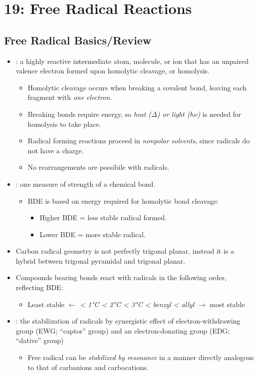\chapter{19: Free Radical Reactions}\label{19: Free Radical Reactions}
\section{Free Radical Basics/Review}\label{Free Radical Basics/Review}
\begin{itemize}
    \item {}: a highly reactive intermediate atom, molecule, or ion that has an unpaired valence electron formed upon homolytic cleavage, or homolysis. 
      \begin{itemize}
        \item Homolytic cleavage occurs when breaking a covalent bond, leaving each fragment with \emph{one electron}.
        \item Breaking bonds require energy, so \emph{heat (\(\Delta \)) or light (\(h\nu \))} is needed for homolysis to take place.
        \item Radical forming reactions proceed in \emph{nonpolar solvents}, since radicals do not have a charge.
        \item No rearrangements are possibile with radicals.
      \end{itemize}
    \item {}: one measure of strength of a chemical bond. 
      \begin{itemize}
        \item BDE is based on energy required for homolytic bond cleavage:
          \begin{itemize}
            \item Higher BDE = less stable radical formed.
            \item Lower BDE = more stable radical.
          \end{itemize}
      \end{itemize}
    \item Carbon radical geometry is not perfectly trigonal planar, instead it is a hybrid between trigonal pyramidal and trigonal planar.
    \item Compounds bearing  bonds react with radicals in the following order, reflecting  BDE\@:
      \begin{itemize}
        \item Least stable \(\leftarrow \) \emph{ < \ang{1}C < \ang{2}C < \ang{3}C < benzyl < allyl} \(\rightarrow \) most stable
      \end{itemize}
    \item {}: the stabilization of radicals by synergistic effect of electron-withdrawing group (EWG\@; ``captor'' group) and an electron-donating group (EDG\@; ``dative'' group)
      \begin{itemize}
        \item Free radical can be \emph{stabilized by resonance }in a manner directly analogous to that of carbanions and carbocations.
      \end{itemize} 
\end{itemize}


